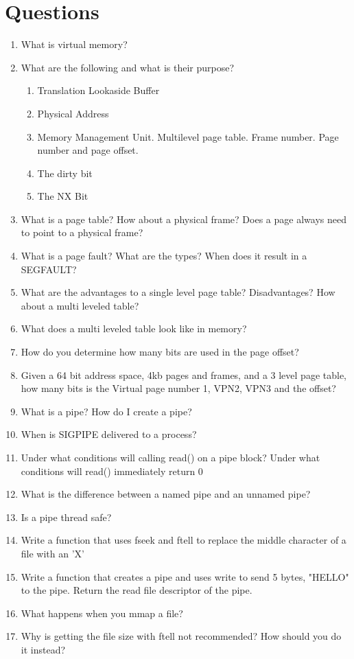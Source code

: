 \section{Questions}

\begin{enumerate}
\item What is virtual memory?
\item What are the following and what is their purpose?
  \begin{enumerate}
    \item Translation Lookaside Buffer
    \item Physical Address
    \item Memory Management Unit. Multilevel page table. Frame number. Page number and page offset.
    \item The dirty bit
    \item The NX Bit
  \end{enumerate}
\item What is a page table? How about a physical frame? Does a page always need to point to a physical frame?
\item What is a page fault? What are the types? When does it result in a SEGFAULT?
\item What are the advantages to a single level page table? Disadvantages? How about a multi leveled table?
\item What does a multi leveled table look like in memory?
\item How do you determine how many bits are used in the page offset?
\item Given a 64 bit address space, 4kb pages and frames, and a 3 level page table, how many bits is the Virtual page number 1, VPN2, VPN3 and the offset?
\item What is a pipe? How do I create a pipe?
\item When is SIGPIPE delivered to a process?
\item Under what conditions will calling read() on a pipe block? Under what conditions will read() immediately return 0
\item What is the difference between a named pipe and an unnamed pipe?
\item Is a pipe thread safe?
\item Write a function that uses fseek and ftell to replace the middle character of a file with an 'X'
\item Write a function that creates a pipe and uses write to send 5 bytes, "HELLO" to the pipe. Return the read file descriptor of the pipe.
\item What happens when you mmap a file?
\item Why is getting the file size with ftell not recommended? How should you do it instead?
\end{enumerate}



